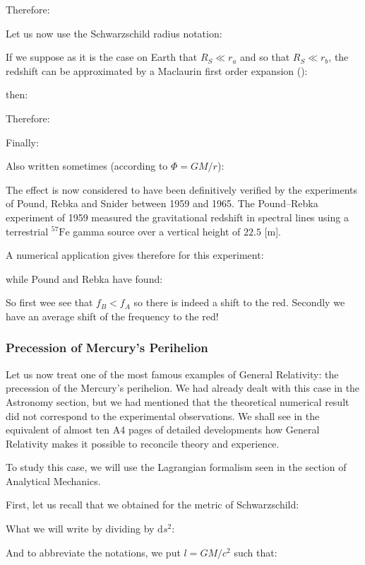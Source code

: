	Therefore:
	
	Let us now use the Schwarzschild radius notation:
	
	If we suppose as it is the case on Earth that $R_S\ll r_a$ and so that $R_S\ll r_b$,  the redshift can be approximated by a Maclaurin first order expansion ():
	
	then:
	
	Therefore:
	
	Finally:
	
	Also written sometimes (according to $\Phi=GM/r$):
	
	The effect is now considered to have been definitively verified by the experiments of Pound, Rebka and Snider between 1959 and 1965. The Pound–Rebka experiment of 1959 measured the gravitational redshift in spectral lines using a terrestrial $^{57}\mathrm{Fe}$ gamma source over a vertical height of $22.5$ [m].
	
	A numerical application gives therefore for this experiment:
	
	while Pound and Rebka have found: 
	
	
	So first wee see that $f_B<f_A$ so there is indeed a shift to the red. Secondly we have an average shift of the frequency to the red!
	
	\subsubsection{Precession of Mercury's Perihelion}\label{general relativity precession of mercury perihelion}
	Let us now treat one of the most famous examples of General Relativity: the precession of the Mercury's perihelion. We had already dealt with this case in the Astronomy section, but we had mentioned that the theoretical numerical result did not correspond to the experimental observations. We shall see in the equivalent of almost ten A4 pages of detailed developments how General Relativity makes it possible to reconcile theory and experience.

	To study this case, we will use the Lagrangian formalism seen in the section of Analytical Mechanics.

	First, let us recall that we obtained for the metric of Schwarzschild:
	
	What we will write by dividing by $\mathrm{d}s^2$:
	
	And to abbreviate the notations, we put $l=GM/c^2$ such that:
	
